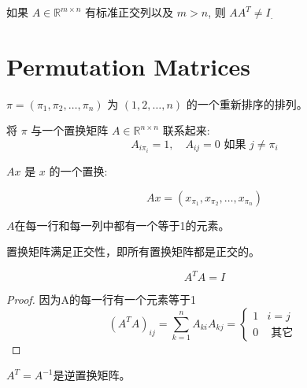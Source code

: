 \begin{remark}
    如果 $ A \in \mathbb{R}^{m \times n} $ 有标准正交列以及 $ m>n $, 则 $ A A^{T} \neq I_{\text {. }} $
\end{remark}

\section{Permutation Matrices}

\begin{notation}
    $ \pi=\left(\pi_{1}, \pi_{2}, \ldots, \pi_{n}\right) $ 为 $ (1,2, \ldots, n) $ 的一个重新排序的排列。

    将 $ \pi $ 与一个置换矩阵 $ A \in \mathbb{R}^{n \times n} $ 联系起来:
$$
A_{i \pi_{i}}=1, \quad A_{i j}=0 \text { 如果 } j \neq \pi_{i}
$$
\end{notation}

\begin{definition}[置换]
    $ A x $ 是 $ x $ 的一个置换:
    
    $$ A x=\left(x_{\pi_{1}}, x_{\pi_{2}}, \ldots, x_{\pi_{n}}\right) $$
\end{definition}

$A$在每一行和每一列中都有一个等于1的元素。

\begin{theorem}
    置换矩阵满足正交性，即所有置换矩阵都是正交的。
\end{theorem}

\begin{corollary}
    $$ A^{T} A=I $$
\end{corollary}

\begin{proof}
    因为A的每一行有一个元素等于1
$$
\left(A^{T} A\right)_{i j}=\sum_{k=1}^{n} A_{k i} A_{k j}=\left\{\begin{array}{ll}
1 & i=j \\
0 & \text { 其它 }
\end{array}\right.
$$
\end{proof}

\begin{corollary}
    $ A^{T}=A^{-1} $是逆置换矩阵。
\end{corollary}


